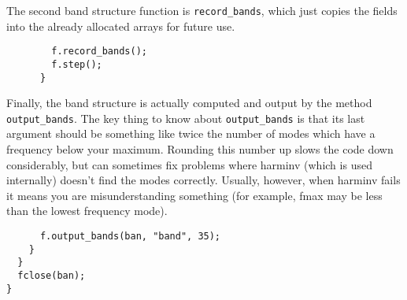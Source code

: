 The second band structure function is \verb-record_bands-, which just
copies the fields into the already allocated arrays for future use.

\begin{verbatim}
        f.record_bands();
        f.step();
      }
\end{verbatim}

Finally, the band structure is actually computed and output by the method
\verb-output_bands-.  The key thing to know about
\verb-output_bands- is that its last argument should be something like
twice the number of modes which have a frequency below your maximum.
Rounding this number up slows the code down considerably, but can sometimes
fix problems where harminv (which is used internally) doesn't find the
modes correctly.  Usually, however, when harminv fails it means you are
misunderstanding something (for example, fmax may be less than the lowest
frequency mode).

\begin{verbatim}
      f.output_bands(ban, "band", 35);
    }
  }
  fclose(ban);
}
\end{verbatim}
